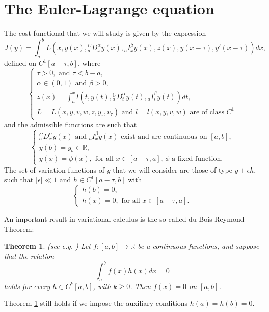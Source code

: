 \documentclass[10pt]{article}
\newtheorem{theorem}{Theorem}
\begin{document}
\section{The Euler-Lagrange equation}\label{sec:ELequation}
\label{sec:ELequation}

The cost functional that we will study is given by the expression
\begin{equation}
\label{funct}
J(y)=\int_a^b L(x,y(x),{^C_aD_x^\alpha}y(x),{_aI_x^\beta}y(x),z(x), y(x-\tau), y'(x-\tau))dx,
\end{equation}
defined on $C^1[a-\tau,b]$, where
$$\left\{
\begin{array}{l}
\tau>0, \mbox{ and } \tau<b-a,\\
\alpha\in(0,1) \mbox{ and }\beta>0,\\
z(x)=\int_a^x l(t,y(t),{^C_aD_t^\alpha}y(t),{_aI_t^\beta}y(t))dt,\\
L=L(x,y,v,w,z,y_\tau,v_\tau) \mbox{ and } l=l(x,y,v,w) \mbox{ are of class } C^1
\end{array}\right.$$
and the admissible functions are such that
$$\left\{
\begin{array}{l}
{^C_aD_x^\alpha}y(x) \mbox{ and } {_aI_x^\beta}y(x) \mbox{ exist and are continuous on } [a,b],\\
y(b)=y_b\in \mathbb R,\\
y(x)=\phi(x), \mbox{ for all } x\in [a-\tau,a], \, \phi \mbox{ a fixed function.}
\end{array}\right.$$
The set of variation functions of $y$ that we will consider are those of type $y+\epsilon h$, such that $|\epsilon| \ll1$ and $h\in C^1[a-\tau,b]$ with
$$\left\{
\begin{array}{l}
h(b)=0,\\
h(x)=0, \mbox{ for all } x\in [a-\tau,a].
\end{array}\right.$$

An important result in variational calculus is the so called du Bois-Reymond Theorem:

\begin{theorem}\label{dubois} (see e.g. \cite{Brunt}) Let $f:[a,b]\to\mathbb R$ be a continuous functions, and suppose that the relation
$$\int_a^b f(x)h(x)dx=0$$
holds for every $h\in C^k[a,b]$, with $k\geq 0$. Then $f(x)=0$ on $[a,b]$.
\end{theorem}

Theorem \ref{dubois} still holds if we impose the auxiliary conditions $h(a)=h(b)=0$.
\end{document}
